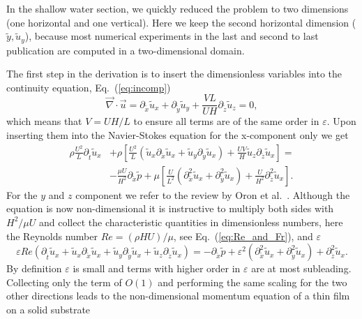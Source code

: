 In the shallow water section, we quickly reduced the problem to two dimensions (one horizontal and one vertical).
Here we keep the second horizontal dimension ($\tilde{y}, \tilde{u}_y$), because most numerical experiments in the last and second to last publication are computed in a two-dimensional domain. 
 
The first step in the derivation is to insert the dimensionless variables into the continuity equation, Eq.~(\ref{eq:incomp})
\begin{equation}\label{eq:cont_thin_film_1}
     \vec{\nabla}\cdot\vec{u} = \partial_{\tilde{x}} \tilde{u}_x + \partial_{\tilde{y}} \tilde{u}_y + \frac{V L}{U H}\partial_{\tilde{z}} \tilde{u}_z = 0,
\end{equation}
which means that $V = U H/L$ to ensure all terms are of the same order in $\varepsilon$.
Upon inserting them into the Navier-Stokes equation for the x-component only we get
\begin{align}
     \rho \frac{U^2}{L} \partial_{\tilde{t}}\tilde{u}_x &+ \rho\left[\frac{U^2}{L}\left(\tilde{u}_x\partial_{\tilde{x}}\tilde{u}_x + \tilde{u}_y\partial_{\tilde{y}}\tilde{u}_x\right) + \frac{U V}{H}\tilde{u}_z\partial_{\tilde{z}}\tilde{u}_x\right] = \nonumber \\ &-\frac{\mu U}{H^2} \partial_{\tilde{x}} \tilde{p} + \mu\left[\frac{U}{L^2}(\partial^2_{\tilde{x}}\tilde{u}_x + \partial^2_{\tilde{y}}\tilde{u}_x) + \frac{U}{H^2}\partial^2_{\tilde{z}}\tilde{u}_x\right].
\end{align}
For the $y$ and $z$ component we refer to the review by Oron et al.~\cite{oronLongscaleEvolutionThin1997}.
Although the equation is now non-dimensional it is instructive to multiply both sides with $H^2/\mu U$ and collect the characteristic quantities in dimensionless numbers, here the Reynolds number $Re = (\rho H U)/\mu$, see Eq.~(\ref{eq:Re_and_Fr}), and $\varepsilon$  
\begin{equation}
    \varepsilon Re \left(\partial_{\tilde{t}}\tilde{u}_x + \tilde{u}_x\partial_{\tilde{x}}\tilde{u}_x + \tilde{u}_y\partial_{\tilde{y}}\tilde{u}_x + \tilde{u}_z\partial_{\tilde{z}}\tilde{u}_x \right) = -\partial_{\tilde{x}}\tilde{p} + \varepsilon^2\left(\partial^2_{\tilde{x}}\tilde{u}_x + \partial^2_{\tilde{y}}\tilde{u}_x\right) + \partial^2_{\tilde{z}}\tilde{u}_x. 
\end{equation}
By definition $\varepsilon$ is small and terms with higher order in $\varepsilon$ are at most subleading.
Collecting only the term of $O(1)$ and performing the same scaling for the two other directions leads to the non-dimensional momentum equation of a thin film on a solid substrate
